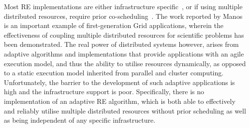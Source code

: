 \documentclass{rspublic}
\begin{document}
Most RE implementations are either infrastructure
specific~\citep{Woods:2005nx}, or if using multiple distributed
resources, require prior co-scheduling~\citep{repex_mpig}.  The work
reported by Manos is an important example of first-generation Grid
applications, wherein the effectiveness of coupling multiple
distributed resources for scientific problems has been demonstrated.
The real power of distributed systems however, arises from adaptive
algorithms and implementations that provide applications with an agile
execution model, and thus the ability to utilise resources
dynamically, as opposed to a static execution model inherited from
parallel and cluster computing.  Unfortunately, the barrier to the
development of such adaptive applications is high and the
infrastructure support is poor.
Specifically, there is no implementation of an
adaptive RE algorithm, which is both able to effectively and reliably
utilise multiple distributed resources without prior scheduling as
well as being independent of any specific %
infrastructure.
                      


\end{document}
